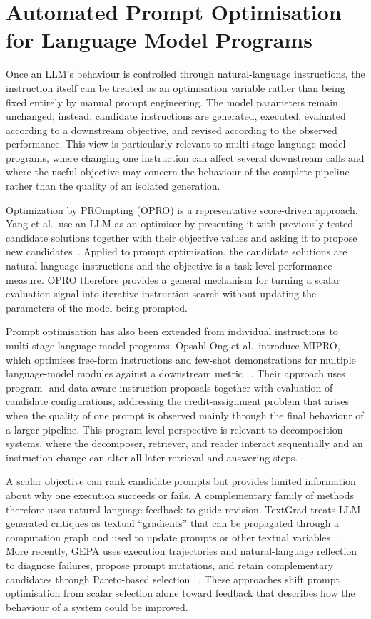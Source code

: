\section{Automated Prompt Optimisation for Language Model Programs}
\label{sec:prompt-optimisation}

Once an LLM's behaviour is controlled through natural-language instructions,
the instruction itself can be treated as an optimisation variable rather than
being fixed entirely by manual prompt engineering. The model parameters remain
unchanged; instead, candidate instructions are generated, executed, evaluated
according to a downstream objective, and revised according to the observed
performance. This view is particularly relevant to multi-stage language-model
programs, where changing one instruction can affect several downstream calls
and where the useful objective may concern the behaviour of the complete
pipeline rather than the quality of an isolated generation.

Optimization by PROmpting (OPRO) is a representative score-driven approach.
Yang et al.\ use an LLM as an optimiser by presenting it with previously tested
candidate solutions together with their objective values and asking it to
propose new candidates~\cite{ch5-opro}. Applied to prompt optimisation, the
candidate solutions are natural-language instructions and the objective is a
task-level performance measure. OPRO therefore provides a general mechanism for
turning a scalar evaluation signal into iterative instruction search without
updating the parameters of the model being prompted.

Prompt optimisation has also been extended from individual instructions to
multi-stage language-model programs. Opsahl-Ong et al.\ introduce MIPRO, which
optimises free-form instructions and few-shot demonstrations for multiple
language-model modules against a downstream metric
~\cite{opsahlong2024mipro}. Their approach uses program- and data-aware
instruction proposals together with evaluation of candidate configurations,
addressing the credit-assignment problem that arises when the quality of one
prompt is observed mainly through the final behaviour of a larger pipeline.
This program-level perspective is relevant to decomposition systems, where the
decomposer, retriever, and reader interact sequentially and an instruction
change can alter all later retrieval and answering steps.

A scalar objective can rank candidate prompts but provides limited information
about why one execution succeeds or fails. A complementary family of methods
therefore uses natural-language feedback to guide revision. TextGrad treats
LLM-generated critiques as textual ``gradients'' that can be propagated through
a computation graph and used to update prompts or other textual variables
~\cite{yuksekgonul2025textgrad}. More recently, GEPA uses execution trajectories
and natural-language reflection to diagnose failures, propose prompt mutations,
and retain complementary candidates through Pareto-based selection
~\cite{ch5-gepa}. These approaches shift prompt optimisation from scalar
selection alone toward feedback that describes how the behaviour of a system
could be improved.

